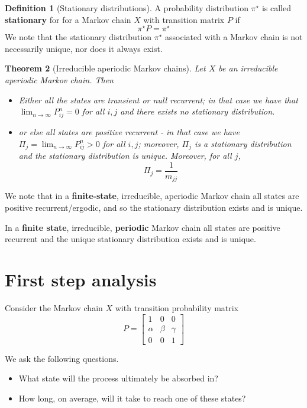 \documentclass[10pt, oneside, reqno]{amsart}
\theoremstyle{plain}%
\newtheorem{thm}{Theorem}[section]
\theoremstyle{definition}
\newtheorem{defn}[thm]{Definition}
\theoremstyle{remark}
\begin{document}

\begin{defn}[Stationary distributions]
	A probability distribution $\pi^\star$ is called \textbf{stationary} for for a Markov chain $X$ with transition matrix $P$ if \[
		\pi^\star P = \pi^\star
	\]
We note that the stationary distribution $\pi^\star$ associated with a Markov chain is not necessarily unique, nor does it always exist.
\end{defn}

\begin{thm}[Irreducible aperiodic Markov chains]
		Let $X$ be an irreducible aperiodic Markov chain.  Then
		\begin{itemize}
			\item Either all the states are transient or null recurrent; in that case we have that $\lim_{n \rightarrow \infty} P^n_{ij} = 0$ for all $i,j$ and there exists no stationary distribution.
			\item or else all states are positive recurrent - in that case we have $\Pi_j = \lim_{n \rightarrow \infty} P^n_{ij} > 0$ for all $i,j$; moreover, $\Pi_j$ is a stationary distribution and the stationary distribution is unique.  Moreover, for all $j$, \[
				\Pi_j = \frac{1}{m_{jj}}
			\]
		\end{itemize}
		
\end{thm}
	We note that in a \textbf{finite-state}, irreducible, aperiodic Markov chain all states are positive recurrent/ergodic, and so the stationary distribution exists and is unique.

In a \textbf{finite state}, irreducible, \textbf{periodic} Markov chain all states are positive recurrent and the unique stationary distribution exists and is unique.




\section{First step analysis} %
\label{sub:first_step_analysis}
Consider the Markov chain $X$ with transition probability matrix 
\[
	P = \begin{bmatrix}
			1 & 0 & 0 \\
			\alpha & \beta & \gamma \\
			0 & 0 & 1
	\end{bmatrix}	
\]

We ask the following questions.
\begin{itemize}
	\item What state will the process ultimately be absorbed in?
	\item How long, on average, will it take to reach one of these states?
\end{itemize}
\end{document}
